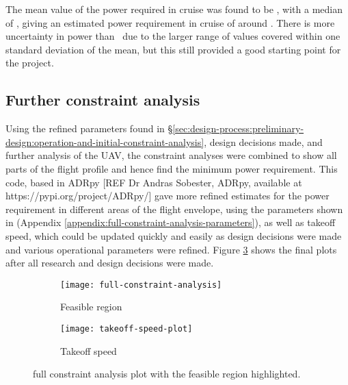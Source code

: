 \documentclass[../../main.tex]{subfiles}
\begin{document}
The mean value of the power required in cruise was found to be , with a median of , giving an estimated power requirement in cruise of around .
There is more uncertainty in power than \vcruise\, due to the larger range of values covered within one standard deviation of the mean, but this still provided a good starting point for the project.

\subsection{Further constraint analysis} \label{sec:design-process:preliminary-design:further-constraint-analysis}

Using the refined parameters found in \S \ref{sec:design-process:preliminary-design:operation-and-initial-constraint-analysis}, design decisions made, and further analysis of the UAV, the constraint analyses were combined to show all parts of the flight profile and hence find the minimum power requirement.
This code, based in ADRpy [REF Dr Andras Sobester, ADRpy, available at https://pypi.org/project/ADRpy/] gave more refined estimates for the power requirement in different areas of the flight envelope, using the parameters shown in (Appendix \ref{appendix:full-constraint-analysis-parameters}), as well as takeoff speed, which could be updated quickly and easily as design decisions were made and various operational parameters were refined.
Figure \ref{fig:constraint-analysis} shows the final plots after all research and design decisions were made.


\begin{figure}[H]
    \centering
    \begin{subfigure}[b]{0.85\columnwidth}
        \centering
        \texttt{[image: full-constraint-analysis]}
        \caption{Feasible region}
        \label{fig:constraint-analysis:full}
    \end{subfigure}
    \hfill
    \begin{subfigure}[b]{0.85\columnwidth}
        \centering
        \texttt{[image: takeoff-speed-plot]}
        \caption{Takeoff speed}
        \label{fig:constraint-analysis:takeoff-speed}
    \end{subfigure}

    \caption{full constraint analysis plot with the feasible region highlighted.}
    \label{fig:constraint-analysis}
\end{figure}
\end{document}

